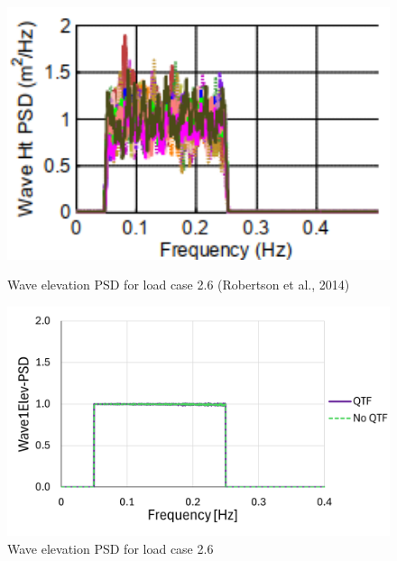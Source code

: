 \documentclass[a4paper, 11pt]{article}
\begin{document}
\begin{figure}[H]
    \begin{minipage}{0.48\textwidth}
        \centering
        \includegraphics[width=1\textwidth]{2.6_wave.png}
        \caption{\small Wave elevation PSD for load case 2.6 (Robertson et al., 2014)} 
        \label{fig:2.6_wave}
    \end{minipage}
    \hfill
    \begin{minipage}{0.51\textwidth}
        \centering
        \vspace{-0.3cm}
        \includegraphics[width=1\textwidth]{2.6_wave_mine.png}
        \caption{\small Wave elevation PSD for load case 2.6}
        \label{fig:2.6_wave_mine}
    \end{minipage}
\end{figure}
\end{document}
